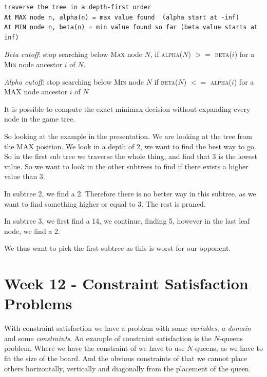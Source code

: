 \documentclass{article}
\begin{document}
\begin{lstlisting}[inputencoding=utf8/latin1, basicstyle=\footnotesize, keywordstyle=\color{blue}\bfseries, rulecolor=\color{black}]
traverse the tree in a depth-first order
At MAX node n, alpha(n) = max value found  (alpha start at -inf)
At MIN node n, beta(n) = min value found so far (beta value starts at inf)
\end{lstlisting}

\emph{Beta cutoff}: stop searching below \textsc{Max} node $N$, if
\textsc{alpha($N$)} $>=$ \textsc{beta($i$)} for a \textsc{Min} node ancestor $i$ of $N$.

\emph{Alpha cutoff}: stop searching below \textsc{Min} node $N$ if
\textsc{beta($N$)} $<=$ \textsc{alpha($i$)} for a MAX node ancestor $i$ of $N$

It is possible to compute the exact minimax decision without expanding every
node in the game tree.

So looking at the example in the presentation. We are looking at the tree from
the MAX position. We look in a depth of 2, we want to find the best way to go.
So in the first sub tree we traverse the whole thing, and find that 3 is the
lowest value. So we want to look in the other subtrees to find if there exists a
higher value than 3. 

In subtree 2, we find a 2. Therefore there is no better way in this subtree, as
we want to find something higher or equal to 3. The rest is pruned.

In subtree 3, we first find a 14, we continue, finding 5, however in the last
leaf node, we find a 2.

We thus want to pick the first subtree as this is worst for our opponent.

\newpage

\section{Week 12 - Constraint Satisfaction Problems}%
\label{sec:23_march_constraint_satisfaction_problems}

With constraint satisfaction we have a problem with some \emph{variables},
\emph{a domain} and some \emph{constraints}. An example of constraint
satisfaction is the $N$-queens problem. Where we have the constraint of we have
to use $N$-queens, as we have to fit the size of the board. And the obvious
constraints of that we cannot place others horizontally, vertically and
diagonally from the placement of the queen.
\end{document}
